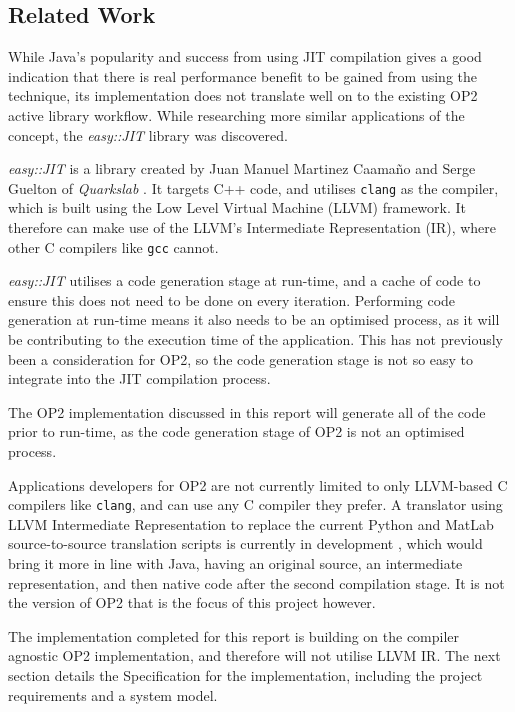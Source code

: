 \subsection{Related Work}

While Java's popularity and success from using JIT compilation gives a good indication that there is real performance benefit to be gained from using the technique, its implementation does not translate well on to the existing OP2 active library workflow. While researching more similar applications of the concept, the \textit{easy::JIT} library was discovered.


\noindent \textit{easy::JIT} \cite{eJIT} is a library created by Juan Manuel Martinez Caamaño and Serge Guelton of \textit{Quarkslab} \cite{Quarkslab}. It targets C++ code, and utilises \verb|clang| \cite{clang} as the compiler, which is built using the Low Level Virtual Machine (LLVM) framework. It therefore can make use of the LLVM's Intermediate Representation (IR), where other C compilers like \verb|gcc| cannot.
\par
\textit{easy::JIT} utilises a code generation stage at run-time, and a cache of code to ensure this does not need to be done on every iteration. Performing code generation at run-time means it also needs to be an optimised process, as it will be contributing to the execution time of the application. This has not previously been a consideration for OP2, so the code generation stage is not so easy to integrate into the JIT compilation process.
\par The OP2 implementation discussed in this report will generate all of the code prior to run-time, as the code generation stage of OP2 is not an optimised process.
\par
Applications developers for OP2 are not currently limited to only LLVM-based C compilers like \verb|clang|, and can use any C compiler they prefer. A translator using LLVM Intermediate Representation to replace the current Python and MatLab source-to-source translation scripts is currently in development \cite{op2clang}, which would bring it more in line with Java, having an original source, an intermediate representation, and then native code after the second compilation stage. It is not the version of OP2 that is the focus of this project however.
\par
The implementation completed for this report is building on the compiler agnostic OP2 implementation, and therefore will not utilise LLVM IR. The next section details the Specification for the implementation, including the project requirements and a system model.
